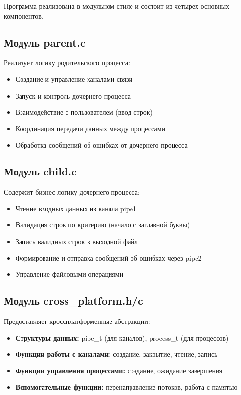 Программа реализована в модульном стиле и состоит из четырех основных компонентов.

\subsection{Модуль parent.c}
Реализует логику родительского процесса:
\begin{itemize}
    \item Создание и управление каналами связи
    \item Запуск и контроль дочернего процесса
    \item Взаимодействие с пользователем (ввод строк)
    \item Координация передачи данных между процессами
    \item Обработка сообщений об ошибках от дочернего процесса
\end{itemize}

\subsection{Модуль child.c}
Содержит бизнес-логику дочернего процесса:
\begin{itemize}
    \item Чтение входных данных из канала pipe1
    \item Валидация строк по критерию (начало с заглавной буквы)
    \item Запись валидных строк в выходной файл
    \item Формирование и отправка сообщений об ошибках через pipe2
    \item Управление файловыми операциями
\end{itemize}

\subsection{Модуль cross\_platform.h/c}
Предоставляет кроссплатформенные абстракции:
\begin{itemize}
    \item \textbf{Структуры данных:} pipe\_t (для каналов), process\_t (для процессов)
    \item \textbf{Функции работы с каналами:} создание, закрытие, чтение, запись
    \item \textbf{Функции управления процессами:} создание, ожидание завершения
    \item \textbf{Вспомогательные функции:} перенаправление потоков, работа с памятью
\end{itemize}

